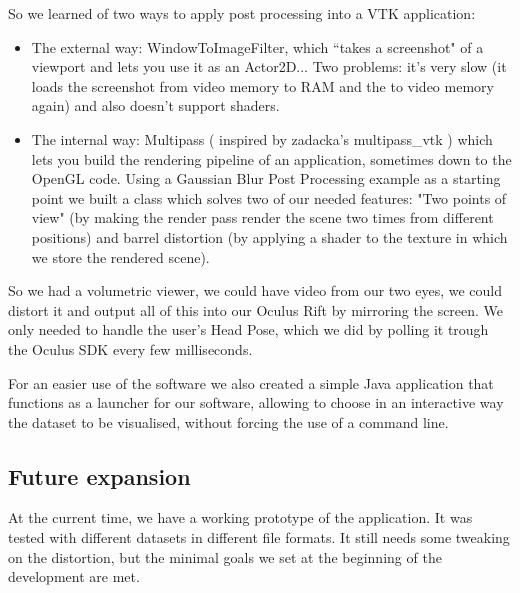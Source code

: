 \documentclass[11pt]{article} %
\begin{document}
So we learned of two ways to apply post processing into a VTK application:
\begin{itemize}
\item The external way: WindowToImageFilter, which ``takes a screenshot" of a viewport and lets you use it as an Actor2D... Two problems: it's very slow (it loads the screenshot from video memory to RAM and the to video memory again) and also doesn't support shaders.
\item The internal way: Multipass ( inspired by zadacka's multipass\_vtk ) which lets you build the rendering pipeline of an application, sometimes down to the OpenGL code. Using a Gaussian Blur Post Processing example as a starting point we built a class which solves two of our needed features: "Two points of view" (by making the render pass render the scene two times from different positions) and barrel distortion (by applying a shader to the texture in which we store the rendered scene).
\end{itemize}
So we had a volumetric viewer, we could have video from our two eyes, we could distort it and output all of this into our Oculus Rift by mirroring the screen.
We only needed to handle the user's Head Pose, which we did by polling it trough the Oculus SDK every few milliseconds.


For an easier use of the software we also created a simple Java application that functions as a launcher for our software, allowing to choose in an interactive way the dataset to be visualised, without forcing the use of a command line.

\subsection{Future expansion}
At the current time, we have a working prototype of the application. It was tested with different datasets in different file formats. It still needs some tweaking on the distortion, but the minimal goals we set at the beginning of the development are met.
\end{document}
